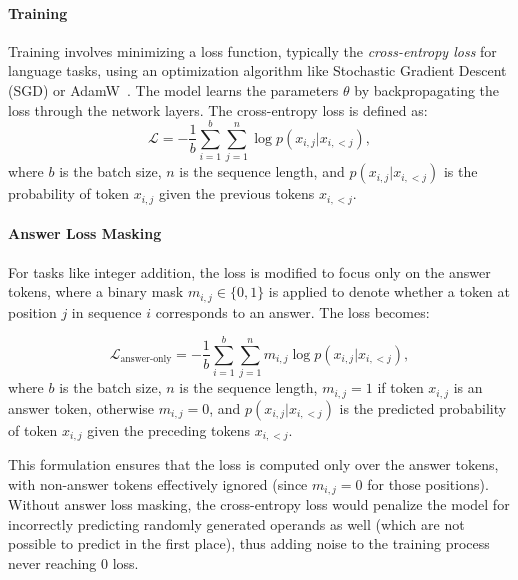 \paragraph{Training}
Training involves minimizing a loss function, typically the \emph{cross-entropy loss} for language tasks, using an optimization algorithm like Stochastic Gradient Descent (SGD) or AdamW~\parencite{loshchilov_decoupled_2018}. The model learns the parameters $\theta$ by backpropagating the loss through the network layers. The cross-entropy loss is defined as:
\begin{equation*}
    \mathcal{L} = -\frac{1}{b} \sum_{i=1}^{b} \sum_{j=1}^{n} \log p(x_{i,j} | x_{i,<j}),
\end{equation*}
where $b$ is the batch size, $n$ is the sequence length, and $p(x_{i,j} | x_{i,<j})$ is the probability of token $x_{i,j}$ given the previous tokens $x_{i,<j}$.

\paragraph{Answer Loss Masking}
For tasks like integer addition, the loss is modified to focus only on the answer tokens, where a binary mask \( m_{i,j} \in \{0, 1\} \) is applied to denote whether a token at position \( j \) in sequence \( i \) corresponds to an answer. The loss becomes:

\begin{equation*}
    \mathcal{L}_{\text{answer-only}} = -\frac{1}{b} \sum_{i=1}^{b} \sum_{j=1}^{n} m_{i,j} \log p(x_{i,j} | x_{i,<j}),
\end{equation*}
where $b$ is the batch size, $n$ is the sequence length, $m_{i,j} = 1$ if token \( x_{i,j} \) is an answer token, otherwise \( m_{i,j} = 0 \), and \( p(x_{i,j} | x_{i,<j}) \) is the predicted probability of token \( x_{i,j} \) given the preceding tokens \( x_{i,<j} \).

This formulation ensures that the loss is computed only over the answer tokens, with non-answer tokens effectively ignored (since \( m_{i,j} = 0 \) for those positions). Without answer loss masking, the cross-entropy loss would penalize the model for incorrectly predicting randomly generated operands as well (which are not possible to predict in the first place), thus adding noise to the training process never reaching 0 loss.


